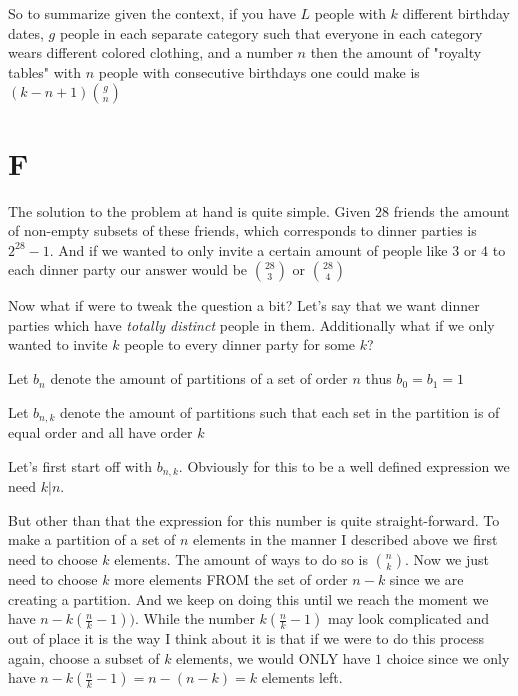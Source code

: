 \documentclass[paper=a4,fontsize=paper,12.5pt]{book}
\newcommand{\3}{\vspace*{3mm}}
\newcommand*{\comb}[2]{\binom{#1}{#2}}
\begin{document}
\3

So to summarize given the context, if you have $L$ people with $k$ different birthday dates, $g$ people in each separate category such that everyone in each category wears different colored clothing, and a number $n$ then the amount of "royalty tables" with $n$ people with consecutive birthdays one could make is $(k-n+1)\comb{g}{n}$

\newpage

\section*{F}

The solution to the problem at hand is quite simple. Given $28$ friends the amount of non-empty subsets of these friends, which corresponds to dinner parties is ${2}^{28} - 1$. And if we wanted to only invite a certain amount of people like $3$ or $4$ to each dinner party our answer would be $\comb{28}{3}$ or $\comb{28}{4}$

\3

Now what if were to tweak the question a bit? Let's say that we want dinner parties which have \textit{totally distinct} people in them. Additionally what if we only wanted to invite $k$ people to every dinner party for some $k$?

\3

\begin{definition}

Let ${b}_{n}$ denote the amount of partitions of a set of order $n$ thus ${b}_{0} = {b}_{1} = 1$

\3

Let ${b}_{n,k}$ denote the amount of partitions such that each set in the partition is of equal order and all have order $k$ 



\end{definition}

\3

Let's first start off with ${b}_{n,k}$. Obviously for this to be a well defined expression we need $k | n$. 

\3

But other than that the expression for this number is quite straight-forward. To make a partition of a set of $n$ elements in the manner I described above we first need to choose $k$ elements. The amount of ways to do so is $\comb{n}{k}$. Now we just need to choose $k$ more elements FROM the set of order $n-k$ since we are creating a partition. And we keep on doing this until we reach the moment we have $n - k(\frac{n}{k} - 1))$. While the number $k(\frac{n}{k} - 1)$ may look complicated and out of place it is the way I think about it is that if we were to do this process again, choose a subset of $k$ elements, we would ONLY have $1$ choice since we only have $n - k(\frac{n}{k} -1) = n - (n - k) = k$ elements left.
\end{document}
